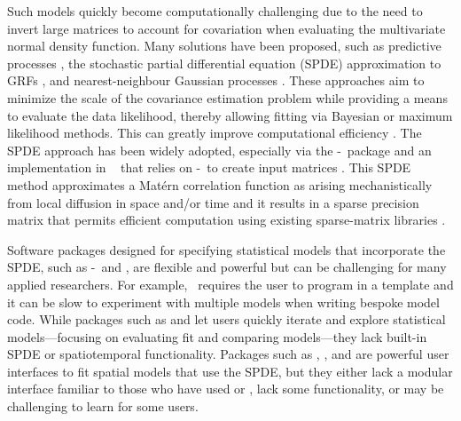 \documentclass[article]{jss}\usepackage[]{graphicx}\usepackage[dvipsnames]{xcolor}
\newcommand{\INLA}{\proglang{R}-\pkg{INLA}}
\newcommand{\TMB}{\pkg{TMB}}
\begin{document}
Such models quickly become computationally challenging due to the need to invert large matrices to account for covariation when evaluating the multivariate normal density function.
Many solutions have been proposed, such as predictive processes \citep{banerjee2008, latimer2009}, the stochastic partial differential equation (SPDE) approximation to GRFs \citep{lindgren2011}, and nearest-neighbour Gaussian processes \citep{datta2016, finley2022}.
These approaches aim to minimize the scale of the covariance estimation problem while providing a means to evaluate the data likelihood, thereby allowing fitting via Bayesian \citep{gelfand2017} or maximum likelihood methods.
This can greatly improve computational efficiency \citep[e.g.,][]{heaton2019}.
The SPDE approach has been widely adopted, especially via the \INLA\ package \citep{rue2009, lindgren2011, lindgren2015} and an implementation in \TMB\ \citep[Template Model Builder,][]{kristensen2016} that relies on \INLA\ to create input matrices \citep{thorson2015ecology, thorson2019, osgood-zimmerman2023, thorsonkristensen2024}.
This SPDE method approximates a Matérn correlation function as arising mechanistically from local diffusion in space and/or time \citep{lindgren2011} and it results in a sparse precision matrix that permits efficient computation using existing sparse-matrix libraries \citep{rue2005gmrf}.

Software packages designed for specifying statistical models that incorporate the SPDE, such as \INLA\ and \TMB, are flexible and powerful but can be challenging for many applied researchers.
For example, \TMB\ requires the user to program in a  template and it can be slow to experiment with multiple models when writing bespoke model code.
While packages such as  \citep{bates2015} and  \citep{brooks2017} let users quickly iterate and explore statistical models---focusing on evaluating fit and comparing models---they lack built-in SPDE or spatiotemporal functionality.
Packages such as  \citep{thorson2019},  \citep{thorson2024tinyvast}, and  \citep{bachl2019} are powerful user interfaces to fit spatial models that use the SPDE, but they either lack a modular interface familiar to those who have used  or , lack some functionality, or may be challenging to learn for some users.
\end{document}
